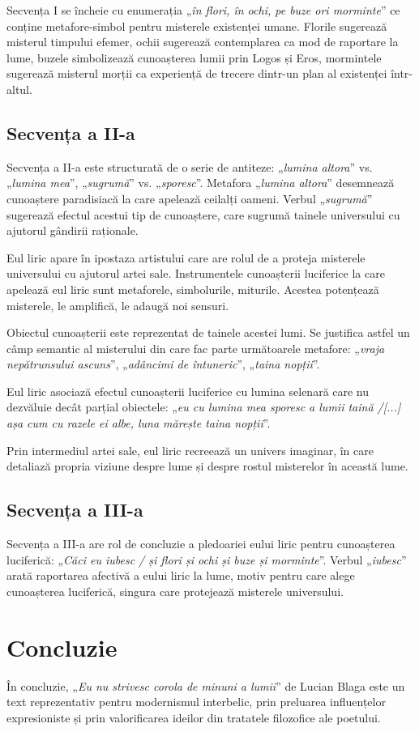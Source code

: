 \documentclass{article}
\newcommand{\qu}[1]{„\emph{#1}”}
\begin{document}
Secvența I se încheie cu enumerația \qu{în flori, în ochi, pe buze ori morminte} ce conține metafore-simbol pentru misterele existenței umane. Florile sugerează misterul timpului efemer, ochii sugerează contemplarea ca mod de raportare la lume, buzele simbolizează cunoașterea lumii prin Logos și Eros, mormintele sugerează misterul morții ca experiență de trecere dintr-un plan al existenței într-altul.

\subsection{Secvența a II-a}
Secvența a II-a este structurată de o serie de antiteze: \qu{lumina altora} vs. \qu{lumina mea}, \qu{sugrumă} vs. \qu{sporesc}. Metafora \qu{lumina altora} desemnează cunoaștere paradisiacă la care apelează ceilalți oameni. Verbul \qu{sugrumă} sugerează efectul acestui tip de cunoaștere, care sugrumă tainele universului cu ajutorul gândirii raționale.

Eul liric apare în ipostaza artistului care are rolul de a proteja misterele universului cu ajutorul artei sale. Instrumentele cunoașterii luciferice la care apelează eul liric sunt metaforele, simbolurile, miturile. Acestea potențează misterele, le amplifică, le adaugă noi sensuri.

Obiectul cunoașterii este reprezentat de tainele acestei lumi. Se justifica astfel un câmp semantic al misterului din care fac parte următoarele metafore: \qu{vraja nepătrunsului ascuns}, \qu{adâncimi de întuneric}, \qu{taina nopții}.

Eul liric asociază efectul cunoașterii luciferice cu lumina selenară care nu dezvăluie decât parțial obiectele: \qu{eu cu lumina mea sporesc a lumii taină /[...] așa cum cu razele ei albe, luna mărește taina nopții}.

Prin intermediul artei sale, eul liric recreează un univers imaginar, în care detaliază propria viziune despre lume și despre rostul misterelor în această lume.

\subsection{Secvența a III-a}
Secvența a III-a are rol de concluzie a pledoariei eului liric pentru cunoașterea luciferică: \qu{Căci eu iubesc / și flori și ochi și buze și morminte}. Verbul \qu{iubesc} arată raportarea afectivă a eului liric la lume, motiv pentru care alege cunoașterea luciferică, singura care protejează misterele universului.

\section{Concluzie}
În concluzie, \qu{Eu nu strivesc corola de minuni a lumii} de Lucian Blaga este un text reprezentativ pentru modernismul interbelic, prin preluarea influențelor expresioniste și prin valorificarea ideilor din tratatele filozofice ale poetului.
\end{document}
